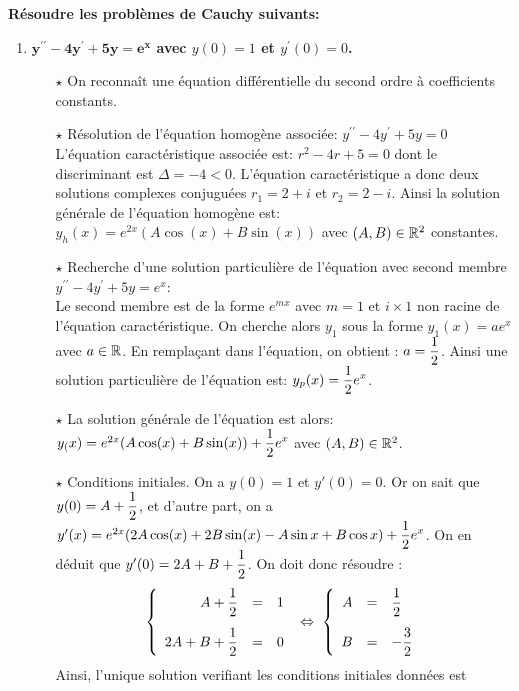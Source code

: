 \documentclass[a4paper, 11pt,reqno]{article}
\begin{document}
\begin{correction}  \;
\textbf{R\'esoudre les probl\`emes de Cauchy suivants:}
\begin{enumerate}
\item \textbf{$\mathbf{y^{\prime\prime}-4y^{\prime}+5y=e^x}$ avec $y(0)=1$ et $y^{\prime}(0)=0$.}\\
\begin{itemize}
\item[$\star$] On reconna\^{i}t une \'equation diff\'erentielle du second ordre \`{a} coefficients constants.
\item[$\star$] R\'esolution de l'\'equation homog\`{e}ne associ\'ee: $y^{\prime\prime}-4y^{\prime}+5y=0$\\
\noindent L'\'equation caract\'eristique associ\'ee est: $r^2-4r+5=0$ dont le discriminant est $\Delta=-4<0$. L'\'equation caract\'eristique a donc deux solutions complexes conjugu\'ees $r_1=2+i$ et $r_2=2-i$. Ainsi la solution g\'en\'erale de l'\'equation homog\`{e}ne est: $y_h(x) = e^{2x}(A \cos(x) + B \sin(x))$ avec $(A,B)\in\mathbb{R}^2$ constantes.
\item[$\star$] Recherche d'une solution particuli\`{e}re de l'\'equation avec second membre $y^{\prime\prime}-4y^{\prime}+5y=e^x$:\\
\noindent Le second membre est de la forme $e^{mx}$ avec $m=1$ et $i\times 1$ non racine de l'\'equation caract\'eristique. On cherche alors $y_1$ sous la forme $y_1(x)=a e^{x}$ avec $a \in \mathbb{R}$. En rempla\c cant dans l'\'equation, on obtient : $a=\displaystyle \frac{1}{2}$. Ainsi une solution particuli\`{e}re de l'\'equation est: $y_p(x)= \displaystyle \frac{1}{2} e^x$.
\item[$\star$] La solution g\'en\'erale de l'\'equation est alors: $y_(x) = e^{2x}(A \cos(x) + B \sin(x)) + \displaystyle \frac{1}{2} e^x$ avec $(A,B)\in\mathbb{R}^2$.
\item[$\star$] Conditions initiales. On a $y(0)=1$ et $y'(0)=0$. Or on sait que $y(0)=A+\displaystyle\frac{1}{2}$, et d'autre part, on a $y'(x)=e^{2x}(2A \cos(x) + 2B \sin(x)-A\sin x +B \cos x) +\displaystyle \frac{1}{2}e^x$. On en d\'eduit que $y'(0)=2A+B+\displaystyle \frac{1}{2}$. On doit donc r\'esoudre :
$$\left\{ \begin{array}{rcl}
A+\ddp\frac{1}{2} & = & 1\vsec\\
2A+B+\ddp \frac{1}{2} & = & 0
\end{array} \right. \; \Leftrightarrow \; 
\left\{ \begin{array}{rcl}
A & = & \ddp \frac{1}{2} \vsec\\
B & = & \ddp -\frac{3}{2}
\end{array} \right.$$
Ainsi, l'unique solution v\?erifiant les conditions initiales donn\'ees est 


\end{itemize}
\end{enumerate}
\end{correction}
\end{document}
